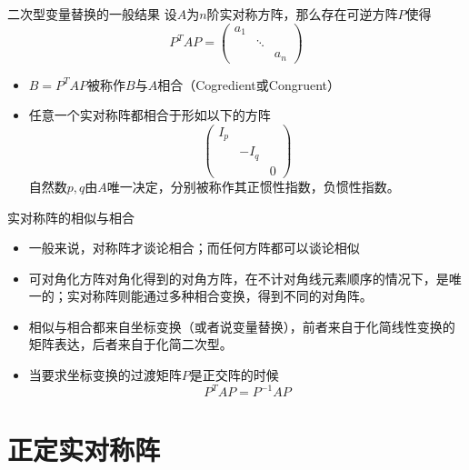 
\begin{frame}

\begin{block}{二次型变量替换的一般结果}
设$A$为$n$阶实对称方阵，那么存在可逆方阵$P$使得
\[P^T A P = \begin{pmatrix} a_1 & & \\ & \ddots & \\ & & a_n \end{pmatrix}\]
\end{block}

\pause

\begin{itemize}
\item $B = P^TAP$被称作$B$与$A$相合（Cogredient或Congruent）
\item 任意一个实对称阵都相合于形如以下的方阵
\[\begin{pmatrix} I_p & & \\ & -I_q & \\ & & 0 \end{pmatrix}\]
自然数$p,q$由$A$唯一决定，分别被称作其正惯性指数，负惯性指数。
\end{itemize}

\end{frame}


\begin{frame}

\begin{block}{实对称阵的相似与相合}
\begin{itemize}
\item 一般来说，对称阵才谈论相合；而任何方阵都可以谈论相似
\item 可对角化方阵对角化得到的对角方阵，在不计对角线元素顺序的情况下，是唯一的；实对称阵则能通过多种相合变换，得到不同的对角阵。
\item 相似与相合都来自坐标变换（或者说变量替换），前者来自于化简线性变换的矩阵表达，后者来自于化简二次型。
\item 当要求坐标变换的过渡矩阵$P$是正交阵的时候
\[P^T A P = P^{-1}AP\]
\end{itemize}
\end{block}

\end{frame}


\section{正定实对称阵}

